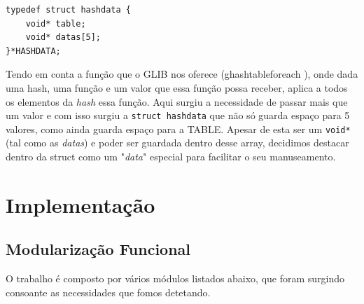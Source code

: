 \documentclass[a4paper]{article}
\begin{document}
\begin{verbatim}
typedef struct hashdata {
    void* table; 
    void* datas[5]; 
}*HASHDATA;
\end{verbatim}

Tendo em conta a função que o GLIB nos oferece (g\textunderscore hash\textunderscore table\textunderscore foreach \cite{ghtForeach}), onde dada uma hash, uma função e um valor que essa função possa receber, aplica a todos os elementos da \textit{hash} essa função. Aqui surgiu a necessidade de passar mais que um valor e com isso surgiu a \texttt{struct hashdata} que não só guarda espaço para 5 valores, como ainda guarda espaço para a TABLE. Apesar de esta ser um \texttt{void*} (tal como as \textit{datas}) e poder ser guardada dentro desse array, decidimos destacar dentro da struct como um "\textit{data}" especial para facilitar o seu manuseamento.


\section{Implementação}
\label{sec:implementacao}

\subsection{Modularização Funcional}
\label{sec:organizacao}

O trabalho é composto por vários módulos listados abaixo, que foram surgindo consoante as necessidades que fomos detetando.
\end{document}
